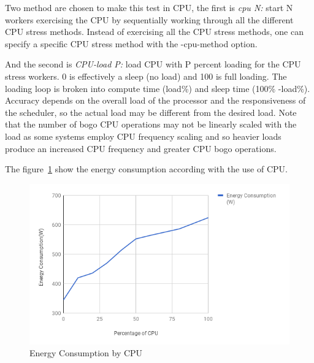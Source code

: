 \documentclass[runningheads,a4paper]{llncs}
\begin{document}
Two method are chosen to make this test in CPU, the first is \textit{cpu N:} start N workers exercising the CPU by sequentially working through all the different CPU stress methods. Instead of exercising all the CPU stress methods, one can specify a specific CPU stress method with the -cpu-method option.


And the second is \textit{CPU-load P:} load CPU with P percent loading for the CPU stress workers. 0 is effectively a sleep (no load) and 100 is full loading. The loading loop is broken into compute time (load\%) and sleep time (100\% -load\%). Accuracy depends on the overall load of the processor and the responsiveness of the scheduler, so the actual load may be different from the desired load. Note that the number of bogo CPU operations may not be linearly scaled with the load as some systems employ CPU frequency scaling and so heavier loads produce an increased CPU frequency and greater CPU bogo operations.


The figure~\ref{fig:usageCPU} show the energy consumption according with the use of CPU.
\begin{figure}[]
    \centering
    \includegraphics[scale=0.6]{imagens/CPU.png}
    \caption{Energy Consumption by CPU}
    \label{fig:usageCPU}
\end{figure}
\end{document}
